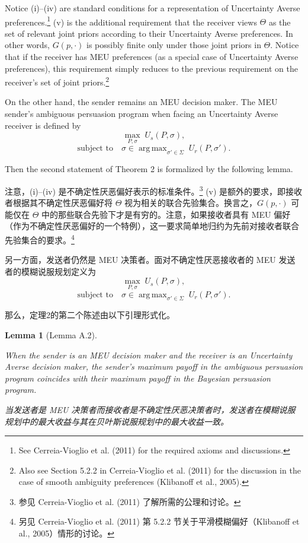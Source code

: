 \documentclass[12pt,a4paper]{article}
\newtheorem{lemma}[theorem]{Lemma}
\theoremstyle{definition}
\theoremstyle{remark}
\newenvironment{original}{%
    \par\medskip\noindent%
    \begin{tcolorbox}[%
        colback=white,%
        colframe=black!50,%
        title=\textbf{Original English},%
        fonttitle=\small\bfseries,%
        left=0pt, right=0pt, top=2pt, bottom=2pt,%
        boxrule=0.5pt,%
        arc=0pt,%
        outer arc=0pt%
    ]%
    \small%
}{%
    \end{tcolorbox}%
}
\newenvironment{translation}{%
    \par\smallskip\noindent%
    \begin{tcolorbox}[%
        colback=blue!3!white,%
        colframe=blue!40!black,%
        title=\textbf{中文翻译},%
        fonttitle=\small\bfseries,%
        left=0pt, right=0pt, top=2pt, bottom=2pt,%
        boxrule=0.5pt,%
        arc=0pt,%
        outer arc=0pt%
    ]%
    \small\color{blue!60!black}%
}{%
    \end{tcolorbox}\medskip%
}
\DeclareMathOperator{\argmax}{arg\,max}
\begin{document}
\begin{original}
Notice (i)--(iv) are standard conditions for a representation of Uncertainty Averse preferences.\footnote{See Cerreia-Vioglio et al. (2011) for the required axioms and discussions.} (v) is the additional requirement that the receiver views $\Theta$ as the set of relevant joint priors according to their Uncertainty Averse preferences. In other words, $G(p, \cdot)$ is possibly finite only under those joint priors in $\Theta$. Notice that if the receiver has MEU preferences (as a special case of Uncertainty Averse preferences), this requirement simply reduces to the previous requirement on the receiver's set of joint priors.\footnote{Also see Section 5.2.2 in Cerreia-Vioglio et al. (2011) for the discussion in the case of smooth ambiguity preferences (Klibanoff et al., 2005).}

On the other hand, the sender remains an MEU decision maker. The MEU sender's ambiguous persuasion program when facing an Uncertainty Averse receiver is defined by
\[
\max_{P, \sigma} \; U_s(P, \sigma),
\]
\[
\text{subject to} \quad \sigma \in \argmax_{\sigma' \in \Sigma} \; U_r(P, \sigma').
\]

Then the second statement of Theorem 2 is formalized by the following lemma.
\end{original}
\begin{translation}
注意，(i)--(iv) 是不确定性厌恶偏好表示的标准条件。\footnote{参见 Cerreia-Vioglio et al. (2011) 了解所需的公理和讨论。} (v) 是额外的要求，即接收者根据其不确定性厌恶偏好将 $\Theta$ 视为相关的联合先验集合。换言之，$G(p, \cdot)$ 可能仅在 $\Theta$ 中的那些联合先验下才是有穷的。注意，如果接收者具有 MEU 偏好（作为不确定性厌恶偏好的一个特例），这一要求简单地归约为先前对接收者联合先验集合的要求。\footnote{另见 Cerreia-Vioglio et al. (2011) 第 5.2.2 节关于平滑模糊偏好（Klibanoff et al., 2005）情形的讨论。}

另一方面，发送者仍然是 MEU 决策者。面对不确定性厌恶接收者的 MEU 发送者的模糊说服规划定义为
\[
\max_{P, \sigma} \; U_s(P, \sigma),
\]
\[
\text{subject to} \quad \sigma \in \argmax_{\sigma' \in \Sigma} \; U_r(P, \sigma').
\]

那么，定理2的第二个陈述由以下引理形式化。
\end{translation}

\begin{lemma}[Lemma A.2]\label{lem:A2}
\begin{original}
When the sender is an MEU decision maker and the receiver is an Uncertainty Averse decision maker, the sender's maximum payoff in the ambiguous persuasion program coincides with their maximum payoff in the Bayesian persuasion program.
\end{original}
\begin{translation}
当发送者是 MEU 决策者而接收者是不确定性厌恶决策者时，发送者在模糊说服规划中的最大收益与其在贝叶斯说服规划中的最大收益一致。
\end{translation}
\end{lemma}
\end{document}
